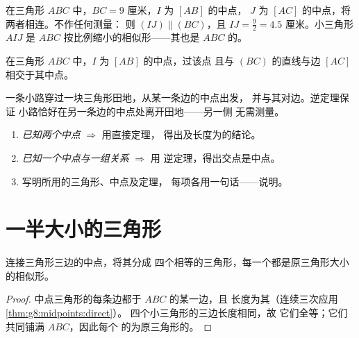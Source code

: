 \begin{example}\label{ex:g8:midpoints:direct}
在三角形 $ABC$ 中，$BC = 9$ 厘米，$I$ 为 $[AB]$ 的中点，
$J$ 为 $[AC]$ 的中点，将两者相连。不作任何测量：
则 $(IJ) \parallel (BC)$，且 $IJ = \frac92 = 4.5$ 厘米。小三角形
$AIJ$ 是 $ABC$ 按比例缩小的相似形——其也是
$ABC$ 的。
\end{example}

\begin{theorem}[逆定理]\label{thm:g8:midpoints:converse}
在三角形 $ABC$ 中，$I$ 为 $[AB]$ 的中点，过该点
且与 $(BC)$ \emph{}的直线与边 $[AC]$ 相交于其中点。
\end{theorem}
\admitted

\begin{example}\label{ex:g8:midpoints:converse}
一条小路穿过一块三角形田地，从某一条边的中点出发，
并与其对边。逆定理保证
小路恰好在另一条边的中点处离开田地——另一侧
无需测量。
\end{example}

\begin{method}[在定理与逆定理之间选择]\label{met:g8:midpoints:choose}
\begin{enumerate}
  \item \emph{已知两个中点} $\Rightarrow$ 用直接定理，
        得出及长度为的结论。
  \item \emph{已知一个中点与一组关系} $\Rightarrow$ 用
        逆定理，得出交点是中点。
  \item 写明所用的三角形、中点及定理，
        每项各用一句话——说明。
\end{enumerate}
\end{method}

\section{一半大小的三角形}

\begin{proposition}[中点三角形]\label{prop:g8:midpoints:medial}
连接三角形三边的中点，将其分成
四个相等的三角形，每一个都是原三角形大小的相似形。
\end{proposition}

\begin{proof}
中点三角形的每条边都于 $ABC$ 的某一边，且
长度为其（连续三次应用\cref{thm:g8:midpoints:direct}）。
四个小三角形的三边长度相同，故
它们全等；它们共同铺满 $ABC$，因此每个
的为原三角形的。
\end{proof}

